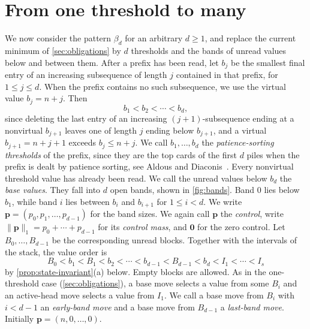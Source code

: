 \documentclass[11pt,reqno]{amsart}
\theoremstyle{definition}
\theoremstyle{remark}
\begin{document}
\section{From one threshold to many}
\label{sec:frontier}

We now consider the pattern $\beta_d$ for an arbitrary $d\geq1$, and replace
the current minimum of \cref{sec:obligations} by $d$ thresholds and the
bands of unread values below and between them.  After a
prefix has been read, let $b_j$ be the smallest final entry of an
increasing subsequence of length $j$ contained in that prefix, for
$1\leq j\leq d$.  When the prefix contains no such subsequence, we use the
virtual value $b_j=n+j$.  Then
\[
 b_1<b_2<\cdots<b_d,
\]
since deleting the last entry of an increasing $(j+1)$-subsequence ending at
a nonvirtual $b_{j+1}$ leaves one of length $j$ ending below $b_{j+1}$, and a
virtual $b_{j+1}=n+j+1$ exceeds $b_j\leq n+j$.
We call $b_1,\ldots,b_d$ the \emph{patience-sorting thresholds} of the
prefix, since they are the top cards of the first $d$ piles when the
prefix is dealt by patience sorting, see Aldous and
Diaconis~\cite{AldousDiaconis1999}.  Every nonvirtual threshold value
has already been read.  We call the unread values below $b_d$ the
\emph{base values}.  They fall into $d$ open bands, shown in \cref{fig:bands}.  Band $0$ lies below
$b_1$, while band $i$ lies between $b_i$ and $b_{i+1}$ for $1\leq i<d$.
We write $\mathbf p=(p_0,p_1,\ldots,p_{d-1})$ for the band sizes.  We again
call $\mathbf p$ the \emph{control}, write $\|\mathbf p\|_1=p_0+\cdots+p_{d-1}$
for its \emph{control mass}, and $\mathbf0$ for the zero control.  Let $B_0,\ldots,B_{d-1}$ be the corresponding unread blocks.
Together with the intervals of the stack, the value order is
\begin{equation}\label{eq:ordered-layout}
 B_0<b_1<B_1<b_2<\cdots<b_{d-1}<B_{d-1}<b_d
 <I_1<\cdots<I_s
\end{equation}
by \cref{prop:state-invariant}(a) below.  Empty
blocks are allowed.  As in the one-threshold case (\cref{sec:obligations}), a
base move selects a value from some $B_i$ and an active-head move
selects a value from $I_1$.  We call a base move from $B_i$ with $i<d-1$ an
\emph{early-band move} and a base move from $B_{d-1}$ a \emph{last-band
move}.  Initially
$\mathbf p=(n,0,\ldots,0)$.
\end{document}
